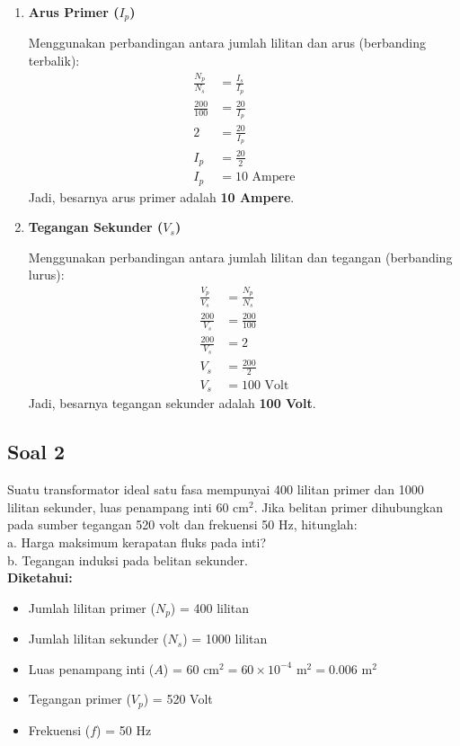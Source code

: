 \documentclass[12pt, a4paper]{article}
\begin{document}
\begin{enumerate}[label=\alph*.]
    \item \textbf{Arus Primer ($I_p$)}

    Menggunakan perbandingan antara jumlah lilitan dan arus (berbanding terbalik):
    \begin{align*}
        \frac{N_p}{N_s} &= \frac{I_s}{I_p} \\
        \frac{200}{100} &= \frac{20}{I_p} \\
        2 &= \frac{20}{I_p} \\
        I_p &= \frac{20}{2} \\
        I_p &= 10 \text{ Ampere}
    \end{align*}
    Jadi, besarnya arus primer adalah \textbf{10 Ampere}.

    \item \textbf{Tegangan Sekunder ($V_s$)}

    Menggunakan perbandingan antara jumlah lilitan dan tegangan (berbanding lurus):
    \begin{align*}
        \frac{V_p}{V_s} &= \frac{N_p}{N_s} \\
        \frac{200}{V_s} &= \frac{200}{100} \\
        \frac{200}{V_s} &= 2 \\
        V_s &= \frac{200}{2} \\
        V_s &= 100 \text{ Volt}
    \end{align*}
    Jadi, besarnya tegangan sekunder adalah \textbf{100 Volt}.
\end{enumerate}

\subsection*{Soal 2}
Suatu transformator ideal satu fasa mempunyai 400 lilitan primer dan 1000 lilitan sekunder, luas penampang inti 60 $\text{cm}^2$. Jika belitan primer dihubungkan pada sumber tegangan 520 volt dan frekuensi 50 Hz, hitunglah:\\
a. Harga maksimum kerapatan fluks pada inti?\\
b. Tegangan induksi pada belitan sekunder.\\

\textbf{Diketahui:}
\begin{itemize}
    \item Jumlah lilitan primer ($N_p$) = 400 lilitan
    \item Jumlah lilitan sekunder ($N_s$) = 1000 lilitan
    \item Luas penampang inti ($A$) = $60 \text{ cm}^2 = 60 \times 10^{-4} \text{ m}^2 = 0.006 \text{ m}^2$
    \item Tegangan primer ($V_p$) = 520 Volt
    \item Frekuensi ($f$) = 50 Hz
\end{itemize}
\end{document}
